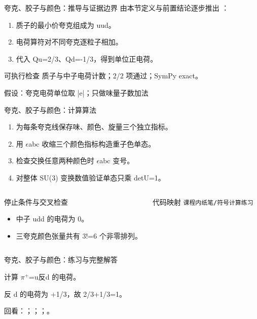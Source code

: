 \begin{frame}[t]{夸克、胶子与颜色：推导与证据边界}
\footnotesize
{}\quad 由本节定义与前置结论逐步推出 ：
\begin{enumerate}
\item 质子的最小价夸克组成为 uud。
\item 电荷算符对不同夸克逐粒子相加。
\item 代入 Qu=2/\allowbreak{}3、Qd=-1/\allowbreak{}3，得到单位正电荷。
\end{enumerate}\begin{block}{可执行检查}
\quad 质子与中子电荷计数；2/2 项通过；SymPy exact。
\par\scriptsize 假设：夸克电荷单位取 |e|；只做味量子数加法
\end{block}
\end{frame}

\begin{frame}[t]{夸克、胶子与颜色：计算算法}
\footnotesize
{}\begin{enumerate}
\item 为每条夸克线保存味、颜色、旋量三个独立指标。
\item 用 \ensuremath{\epsilon}abc 收缩三个颜色指标构造重子色单态。
\item 检查交换任意两种颜色时 \ensuremath{\epsilon}abc 变号。
\item 对整体 SU(3) 变换数值验证单态只乘 detU=1。
\end{enumerate}\begin{columns}[T,onlytextwidth]
\begin{block}{停止条件与交叉检查}\scriptsize\begin{itemize}
\item[\CheckMark] 中子 udd 的电荷为 0。
\item[\CheckMark] 三夸克颜色张量共有 3!=6 个非零排列。
\end{itemize}\end{block}
\begin{block}{代码映射}
\scriptsize \texttt{课程内纸笔/\allowbreak{}符号计算练习}
\end{block}\end{columns}\end{frame}

\begin{frame}[t]{夸克、胶子与颜色：练习与完整解答}
\footnotesize
\begin{block}{}计算 \ensuremath{\pi}\ensuremath{^{+}}=u反d 的电荷。\end{block}
\begin{exampleblock}{}反 d 的电荷为 +1/\allowbreak{}3，故 2/\allowbreak{}3+1/\allowbreak{}3=1。\end{exampleblock}
\vfill
\scriptsize 回看：；；；。
\end{frame}

